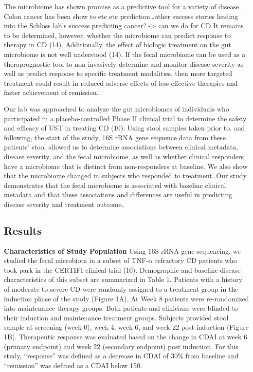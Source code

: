 \documentclass[11pt,]{article}
\begin{document}
The microbiome has shown promise as a predictive tool for a variety of
disease. Colon cancer has been show to etc etc prediction\ldots{}other
success stories leading into the Schloss lab's success predicting
cancer? -\textgreater{} can we do for CD It remains to be determined,
however, whether the microbiome can predict response to therapy in CD
(14). Additionally, the effect of biologic treatment on the gut
microbiome is not well understood (14). If the fecal microbiome can be
used as a theraprognostic tool to non-invasively determine and monitor
disease severity as well as predict response to specific treatment
modalities, then more targeted treatment could result in reduced adverse
effects of less effective therapies and faster achievement of remission.

Our lab was approached to analyze the gut microbiomes of individuals who
participated in a placebo-controlled Phase II clinical trial to
determine the safety and efficacy of UST in treating CD (10). Using
stool samples taken prior to, and following, the start of the study, 16S
rRNA gene sequence data from these patients' stool allowed us to
determine associations between clinical metadata, disease severity, and
the fecal microbiome, as well as whether clinical responders have a
microbiome that is distinct from non-responders at baseline. We also
show that the microbiome changed in subjects who responded to treatment.
Our study demonstrates that the fecal microbiome is associated with
baseline clinical metadata and that these associations and differences
are useful in predicting disease severity and treatment outcome.

\subsection{Results}\label{results}

\textbf{Characteristics of Study Population} Using 16S rRNA gene
sequencing, we studied the fecal microbiota in a subset of
TNF-\({\alpha}\) refractory CD patients who took park in the CERTIFI
clinical trial (10). Demographic and baseline disease characteristics of
this subset are summarized in Table 1. Patients with a history of
moderate to severe CD were randomly assigned to a treatment group in the
induction phase of the study (Figure 1A). At Week 8 patients were
re-randomized into maintenance therapy groups. Both patients and
clinicians were blinded to their induction and maintenance treatment
groups. Subjects provided stool sample at screening (week 0), week 4,
week 6, and week 22 post induction (Figure 1B). Therapeutic response was
evaluated based on the change in CDAI at week 6 (primary endpoint) and
week 22 (secondary endpoint) post induction. For this study,
``response'' was defined as a decrease in CDAI of 30\% from baseline and
``remission'' was defined as a CDAI below 150.
\end{document}
